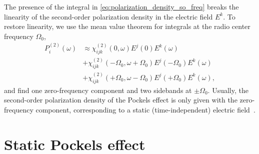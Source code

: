 The presence of the integral in \cref{eq:polarization_density_so_freq} breaks the linearity of the second-order polarization density in the electric field $E^k$.
To restore linearity, we use the mean value theorem for integrals at the radio center frequency $\Omega_0$,
\begin{equation}
	\begin{split}
		P_i^{(2)}(\omega)
		&\approx
		\chi^{(2)}_{ijk}(0,\omega)
		E^j(0)
		E^k(\omega)
		\\
		&+
		\chi^{(2)}_{ijk}(-\Omega_0,\omega+\Omega_0)
		E^j(-\Omega_0)
		E^k(\omega)
		\\
		&+
		\chi^{(2)}_{ijk}(+\Omega_0,\omega-\Omega_0)
		E^j(+\Omega_0)
		E^k(\omega)
		,
	\end{split}
\end{equation}
and find one zero-frequency component and two sidebands at $\pm\Omega_0$.
Usually, the second-order polarization density of the Pockels effect is only given with the zero-frequency component, corresponding to a static (time-independent) electric field~\cite[p.~495]{Boyd2020}.

\section{Static Pockels effect}\label{sec:static_pockels}

